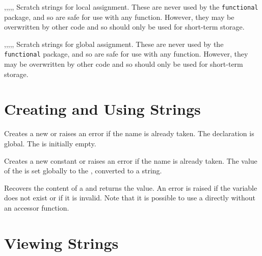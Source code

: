 \documentclass[oneside]{book}
\begin{document}
\begin{variable}{\lTmpaStr,\lTmpbStr,\lTmpcStr,\lTmpiStr,\lTmpjStr,\lTmpkStr}
Scratch strings for local assignment. These are never used by
the \verb!functional! package, and so are safe for use with any
function. However, they may be overwritten by other
code and so should only be used for short-term storage.
\end{variable}

\begin{variable}{\gTmpaStr,\gTmpbStr,\gTmpcStr,\gTmpiStr,\gTmpjStr,\gTmpkStr}
Scratch strings for global assignment. These are never used by
the \verb!functional! package, and so are safe for use with any
function. However, they may be overwritten by other
code and so should only be used for short-term storage.
\end{variable}

\section{Creating and Using Strings}

\begin{function}{\StrNew}
\begin{syntax}
 
\end{syntax}
Creates a new  or raises an error if the name is
already taken. The declaration is global. The  is
initially empty.
\end{function}

\begin{function}{\StrConst}
\begin{syntax}
  
\end{syntax}
Creates a new constant  or raises an error if the name
is already taken.  The value of the  is set
globally to the , converted to a string.
\end{function}

\begin{function}{\StrUse}
\begin{syntax}
 
\end{syntax}
Recovers the content of a  and returns the value.
An error is raised if the variable
does not exist or if it is invalid. Note that it is possible to use
a  directly without an accessor function.
\end{function}

\section{Viewing Strings}
\end{document}
